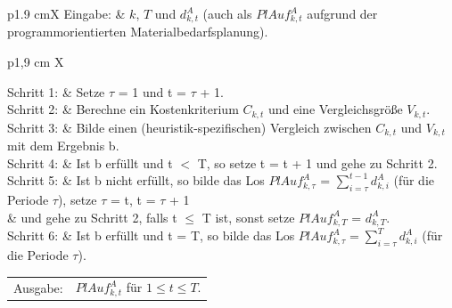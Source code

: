 \begin{algorithmic}
\label{algo:Heuristiken_einstufiges_Losgroessenproblem}
    \STATE
    \begin{tabularx}{\linewidth}{p{1.9 cm}X}
        Eingabe: & $k$, $T$ und $d^{A}_{k,t}$ (auch als $PlAuf^{A}_{k,t}$ aufgrund der programmorientierten Materialbedarfsplanung).
    \end{tabularx}
    \addtocounter{table}{-1} %

    \STATE
    \begin{tabularx}{\linewidth}{p{1,9 cm} X}
         \\
        \rule{0cm}{0,8cm}Schritt 1: &  Setze $\tau$ = 1 und t =  $\tau$ + 1. \\
        Schritt 2: &  Berechne ein Kostenkriterium $C_{k,t} $ und eine Vergleichsgröße $V_{k,t}$. \\
        Schritt 3: &  Bilde einen (heuristik-spezifischen) Vergleich zwischen $C_{k,t}$ und $V_{k,t}$ mit dem Ergebnis b. \\
        Schritt 4: &  Ist b erfüllt und t $<$ T, so setze t = t + 1 und gehe zu Schritt 2. \\
        Schritt 5: &  Ist b nicht erfüllt, so bilde das Los $PlAuf^{A}_{k,\tau}$ = $ \sum_{i=\tau}^{t-1}d^{A}_{k,i} $ (für die Periode $\tau$), setze $\tau$ = t, t = $\tau$ + 1 \\
        & und gehe zu Schritt 2, falls t $\le$ T ist, sonst setze $PlAuf^{A}_{k,T}$ = $d^{A}_{k,T}$. \\
        Schritt 6: & Ist b erfüllt und t = T, so bilde das Los $PlAuf^{A}_{k,\tau} = \sum_{i =\tau}^{T} d^{A}_{k,i}$ (für die Periode $\tau$).
    \end{tabularx}
    \addtocounter{table}{-1} %
    \begin{tabularx}{\linewidth}{p{1.9 cm}X}
        \hspace*{1 mm} Ausgabe: & $PlAuf^{A}_{k,t}$ für $1 \le t \le T$.
    \end{tabularx}
    \addtocounter{table}{-1} %
\end{algorithmic}

